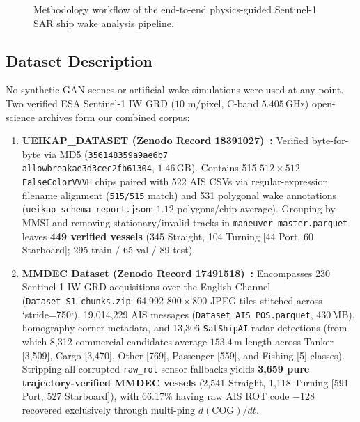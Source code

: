\documentclass[11pt,a4paper]{article}
\begin{document}
\begin{figure}[H]
{
}
\caption{Methodology workflow of the end-to-end physics-guided Sentinel-1 SAR ship wake analysis pipeline.}
\label{fig:methodology_flow}
\end{figure}

\subsection{Dataset Description}
No synthetic GAN scenes or artificial wake simulations were used at any point. Two verified ESA Sentinel-1 IW GRD ($10\text{ m/pixel}$, C-band $5.405$\,GHz) open-science archives form our combined corpus:

\begin{enumerate}[leftmargin=1.5em]
    \item \textbf{UEIKAP\_DATASET (Zenodo Record 18391027)~\cite{mazzeo2026ueikap}:} Verified byte-for-byte via MD5 (\texttt{356148359a9ae6b7\\allowbreak{}ae3d3cec2fb61304}, $1.46$\,GB). Contains 515 $512\times 512$ \texttt{FalseColorVVVH} chips paired with 522 AIS CSVs via regular-expression filename alignment (\texttt{515/515} match) and 531 polygonal wake annotations (\texttt{ueikap\_schema\_report.json}: $1.12$ polygons/chip average). Grouping by MMSI and removing stationary/invalid tracks in \texttt{maneuver\_master.parquet} leaves \textbf{449 verified vessels} (345 Straight, 104 Turning [44 Port, 60 Starboard]; 295 train / 65 val / 89 test).
    \item \textbf{MMDEC Dataset (Zenodo Record 17491518)~\cite{averty_mmdec}:} Encompasses 230 Sentinel-1 IW GRD acquisitions over the English Channel (\texttt{Dataset\_S1\_chunks.zip}: 64,992 $800\times 800$ JPEG tiles stitched across `stride=750`), 19,014,229 AIS messages (\texttt{Dataset\_AIS\_POS.parquet}, $430$\,MB), homography corner metadata, and 13,306 \texttt{SatShipAI} radar detections (from which 8,312 commercial candidates average $153.4$\,m length across Tanker [3,509], Cargo [3,470], Other [769], Passenger [559], and Fishing [5] classes). Stripping all corrupted \texttt{raw\_rot} sensor fallbacks yields \textbf{3,659 pure trajectory-verified MMDEC vessels} (2,541 Straight, 1,118 Turning [591 Port, 527 Starboard]), with 66.17\% having raw AIS ROT code $-128$ recovered exclusively through multi-ping $d(\text{COG})/dt$.
\end{enumerate}
\end{document}
